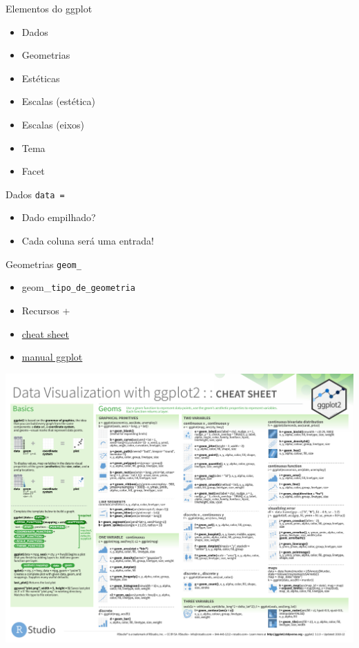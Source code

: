 \documentclass[
  9pt,
  ignorenonframetext,
]{beamer}
\begin{document}
\begin{frame}{Elementos do ggplot}
\protect\hypertarget{elementos-do-ggplot}{}
\begin{itemize}
\item
  Dados
\item
  Geometrias
\item
  Estéticas
\item
  Escalas (estética)
\item
  Escalas (eixos)
\item
  Tema
\item
  Facet
\end{itemize}
\end{frame}

\begin{frame}{Dados \texttt{data\ =}}
\protect\hypertarget{dados-data}{}
\begin{itemize}
\item
  Dado empilhado?
\item
  Cada coluna será uma entrada!
\end{itemize}
\end{frame}

\begin{frame}[fragile]{Geometrias \texttt{geom\_}}
\protect\hypertarget{geometrias-geom_}{}
\begin{itemize}
\item
  geom\_\texttt{tipo\_de\_geometria}
\item
  Recursos +
\item
  \href{https://www.rstudio.com/wp-content/uploads/2016/03/ggplot2-cheatsheet-portuguese.pdf}{cheat
  sheet}
\item
  \href{https://ggplot2.tidyverse.org/reference/}{manual ggplot}
\end{itemize}
\end{frame}

\begin{frame}{}
\protect\hypertarget{section-4}{}
\includegraphics{imgs/datavizCS.pdf}
\end{frame}
\end{document}
